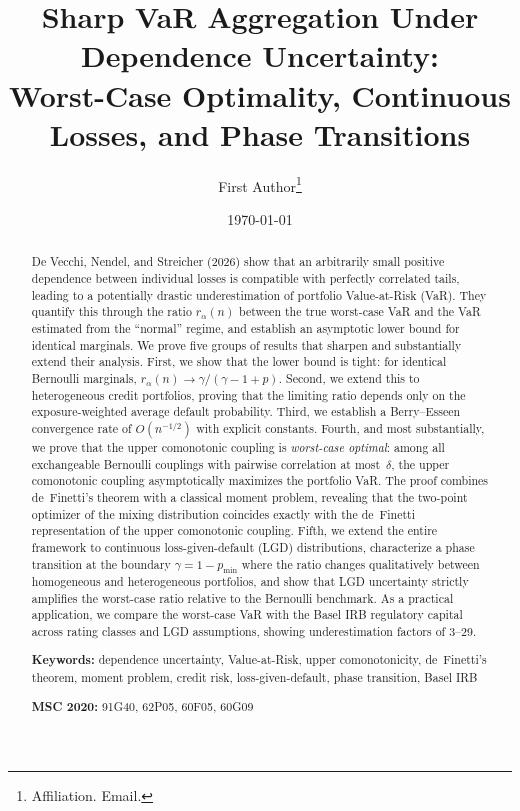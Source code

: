 \documentclass[11pt]{article}
\title{Sharp VaR Aggregation Under Dependence Uncertainty:\\ Worst-Case Optimality, Continuous Losses, and Phase Transitions}
\author{
  First Author\thanks{Affiliation. Email.}
}
\date{\today}
\theoremstyle{definition}
\newcommand{\1}{\mathbf{1}}
\begin{document}
\maketitle

\begin{abstract}
De Vecchi, Nendel, and Streicher (2026) show that an arbitrarily small positive dependence between individual losses is compatible with perfectly correlated tails, leading to a potentially drastic underestimation of portfolio Value-at-Risk (VaR). They quantify this through the ratio $r_\alpha(n)$ between the true worst-case VaR and the VaR estimated from the ``normal'' regime, and establish an asymptotic lower bound for identical marginals. We prove five groups of results that sharpen and substantially extend their analysis. First, we show that the lower bound is tight: for identical Bernoulli marginals, $r_\alpha(n) \to \gamma/(\gamma-1+p)$. Second, we extend this to heterogeneous credit portfolios, proving that the limiting ratio depends only on the exposure-weighted average default probability. Third, we establish a Berry--Esseen convergence rate of $O(n^{-1/2})$ with explicit constants. Fourth, and most substantially, we prove that the upper comonotonic coupling is \emph{worst-case optimal}: among all exchangeable Bernoulli couplings with pairwise correlation at most~$\delta$, the upper comonotonic coupling asymptotically maximizes the portfolio VaR. The proof combines de~Finetti's theorem with a classical moment problem, revealing that the two-point optimizer of the mixing distribution coincides exactly with the de~Finetti representation of the upper comonotonic coupling. Fifth, we extend the entire framework to continuous loss-given-default (LGD) distributions, characterize a phase transition at the boundary $\gamma = 1 - p_{\min}$ where the ratio changes qualitatively between homogeneous and heterogeneous portfolios, and show that LGD uncertainty strictly amplifies the worst-case ratio relative to the Bernoulli benchmark. As a practical application, we compare the worst-case VaR with the Basel IRB regulatory capital across rating classes and LGD assumptions, showing underestimation factors of 3--29.

\medskip\noindent
\textbf{Keywords:} dependence uncertainty, Value-at-Risk, upper comonotonicity, de~Finetti's theorem, moment problem, credit risk, loss-given-default, phase transition, Basel IRB

\medskip\noindent
\textbf{MSC 2020:} 91G40, 62P05, 60F05, 60G09
\end{abstract}
\end{document}

